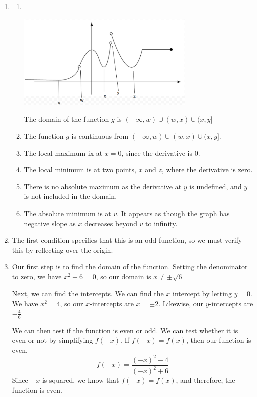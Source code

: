 \documentclass[11pt, letterpaper, twoside]{article}
\begin{document}
\begin{enumerate}
\item 
\begin{enumerate}[label=\alph*)]
\item ‌‌ 

\vspace{0.2cm}
\includegraphics[width=0.7\textwidth]{q1}\par

The domain of the function \(g\) is \((-\infty, w)\cup(w, x)\cup(x, y]\)
\item The function \(g\) is continuous from \((-\infty, w)\cup(w, x)\cup(x, y]\).
\item The local maximum ix at \(x=0\), since the derivative is 0.
\item The local minimum is at two points, \(x\) and \(z\), where the derivative is zero.
\item There is no absolute maximum as the derivative at \(y\) is undefined, and \(y\) is not included in the domain.
\item The absolute minimum is at \(v\). It appears as though the graph has negative slope as \(x\) decreases beyond \(v\) to infinity.
\end{enumerate}
\item %
The first condition specifies that this is an odd function, so we must verify this by reflecting over the origin.

\item %
Our first step is to find the domain of the function.
Setting the denominator to zero, we have \(x^2+6=0\), so our domain is \(x\neq\pm\sqrt6\)

Next, we can find the intercepts. We can find the \(x\) intercept by letting \(y=0\).
We have \(x^2=4\), so our \(x\)-intercepts are \(x=\pm2\).
Likewise, our \(y\)-intercepts are \(-\frac{4}{6}\).

We can then test if the function is even or odd. 
We can test whether it is even or not by simplifying \(f(-x)\). 
If \(f(-x)=f(x)\), then our function is even.
\[f(-x)=\frac{(-x)^2-4}{(-x)^2+6}\]
Since \(-x\) is squared, we know that \(f(-x)=f(x)\), and therefore, the function is even.


\end{enumerate}
\end{document}
